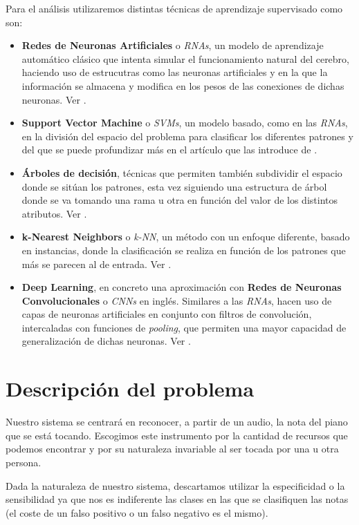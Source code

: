 \documentclass[12pt]{article}
\begin{document}
\bigskip
Para el análisis utilizaremos distintas técnicas de aprendizaje supervisado como son:
\begin{itemize}
	\item \textbf{Redes de Neuronas Artificiales} o \textit{RNAs}, un modelo de aprendizaje automático clásico que
	intenta simular el funcionamiento natural del cerebro, haciendo uso de estrucutras como las neuronas artificiales y en la que
	la información se almacena y modifica en los pesos de las conexiones de dichas neuronas. Ver \cite{krogh2008artificial}.
	\item \textbf{Support Vector Machine} o \textit{SVMs}, un modelo basado, como en las \textit{RNAs}, en la división del espacio del problema para clasificar
	los diferentes patrones y del que se puede profundizar más en el artículo que las introduce de \cite{cortes1995support}.
	\item \textbf{Árboles de decisión}, técnicas que permiten también subdividir el espacio donde se sitúan los patrones, esta vez
	siguiendo una estructura de árbol donde se va tomando una rama u otra en función del valor de los distintos atributos. Ver \cite{myles2004introduction}.
	\item \textbf{k-Nearest Neighbors} o \textit{k-NN}, un método con un enfoque diferente, basado en instancias, donde la clasificación
	se realiza en función de los patrones que más se parecen al de entrada. Ver \cite{guo2003knn}.
	\item \textbf{Deep Learning}, en concreto una aproximación con \textbf{Redes de Neuronas Convolucionales} o \textit{CNNs} en inglés.
	Similares a las \textit{RNAs}, hacen uso de capas de neuronas artificiales en conjunto con filtros de convolución, intercaladas con funciones de 
	\textit{pooling}, que permiten una mayor capacidad de generalización de dichas neuronas. Ver \cite{indolia2018679}.
\end{itemize}
\newpage

\section{Descripción del problema}
\label{Descripción del problema}

Nuestro sistema se centrará en reconocer, a partir de un audio, la nota del piano que se está tocando. Escogimos este instrumento por la cantidad de recursos
que podemos encontrar y por su naturaleza invariable al ser tocada por una u otra persona.

\bigskip
Dada la naturaleza de nuestro sistema, descartamos utilizar la especificidad o la sensibilidad ya que nos es indiferente las clases en las que se clasifiquen
las notas (el coste de un falso positivo o un falso negativo es el mismo).
\end{document}
